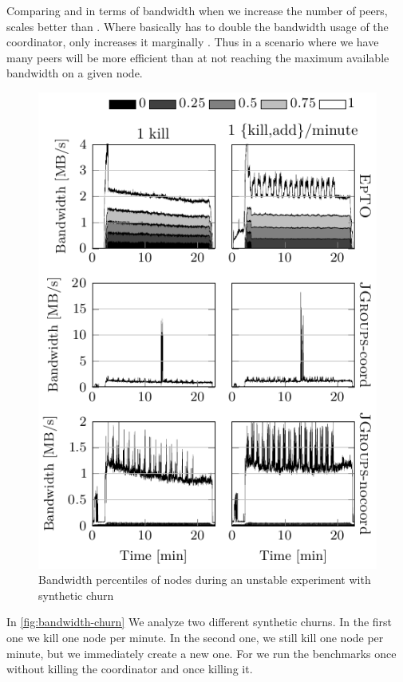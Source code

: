 Comparing \epto and \jgroups in terms of bandwidth when we increase the number of peers, \epto scales better than \jgroups. Where \jgroups basically has to double the bandwidth usage of the coordinator, \epto only increases it marginally . Thus in a scenario where we have many peers \epto will be more efficient than \jgroups at not reaching the maximum available bandwidth on a given node.
 \begin{figure}[hpt]
 	\centering
 	\includegraphics[width=\linewidth]{figures/bandwidth-synth-churn.pdf}
 	\vspace{-2mm} 
 	\caption{Bandwidth percentiles of nodes during an unstable experiment with synthetic churn}
 	\vspace{-2mm} 
 	\label{fig:bandwidth-churn}
 \end{figure}
\par
In \autoref{fig:bandwidth-churn} We analyze two different synthetic churns. In the first one we kill one node per minute. In the second one, we still kill one node per minute, but we immediately create a new one. For \jgroups we run the benchmarks once without killing the coordinator and once killing it.

